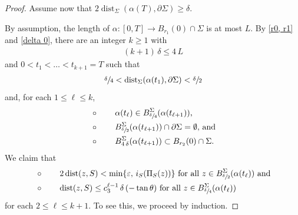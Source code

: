 \documentclass[10pt,a4paper]{amsart}
\begin{document}
\begin{proof}
		
		
		Assume now that $2\operatorname{dist}_\Sigma(\alpha(T),\partial \Sigma)\geq \delta$.
		

By assumption,  the length of $\alpha:[0,T]\to B_{r_1}(0)\cap \Sigma$ is at most $L$. By \eqref{r0, r1} and \eqref{delta 0}, there are an integer $k\geq 1$ with 
		\begin{align} \label{k bound 0}
			(k+1)\,\delta\leq  4\,L
		\end{align}
		and  $0<t_1<\ldots <t_{k+1}=T$ such that 
		\begin{align} \label{p -1}
		\sfrac\delta4<	\operatorname{dist}_\Sigma(\alpha(t_1), \partial \Sigma)<\sfrac\delta2 		
		\end{align} 
	 and, for each $1\leq \ell \leq k$, 
		\begin{align}
			&\circ\qquad  \text{$\alpha(t_{\ell})\in B^\Sigma_{\sfrac{\delta}{4}}(\alpha(t_{\ell+1}))$,} \label{connect 0} \\
			&\circ \qquad \text{$B^\Sigma_{\sfrac{\delta}{2}}{(\alpha(t_{\ell+1}))}\cap \partial \Sigma=\emptyset$, and} \label{sufficiently large ball 1 0}	  \\
			&\circ \qquad \text{$B^\Sigma_{4\,\delta}{(\alpha(t_{\ell+1}))}\subset B_{r_2}(0)\cap\Sigma$.}	\label{sufficiently large ball 2 0}	 		
		\end{align}
		We claim that 
		\begin{align}
			&\circ \qquad \text{$2\operatorname{dist}(z,S)<\min\{\varepsilon,\,i_S(\Pi_S(z))\}$ for all  $z\in B^\Sigma_{\sfrac{\delta}{2}}(\alpha(t_\ell))$ and} \label{to show 1 0}\\
			&\circ\qquad  
			\operatorname{dist}(z,S)\leq c_3^{\ell-1}\,\delta\,(-\tan\theta)  \text{ for all  $z\in B^\Sigma_{\sfrac{\delta}{4}}{(\alpha(t_\ell))}$} \label{to show 2 0} 
		\end{align}			
		for each $2\leq \ell \leq k+1$.
		To see this, we proceed by induction. 
		

\end{proof}
\end{document}
